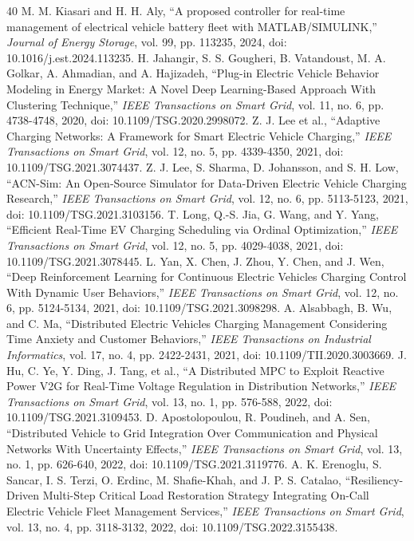 \documentclass[journal]{IEEEtran}
\begin{document}
\balance
\begin{thebibliography}{40}
 M. M. Kiasari and H. H. Aly, ``A proposed controller for real-time management of electrical vehicle battery fleet with MATLAB/SIMULINK,'' \emph{Journal of Energy Storage}, vol. 99, pp. 113235, 2024, doi: 10.1016/j.est.2024.113235.
 H. Jahangir, S. S. Gougheri, B. Vatandoust, M. A. Golkar, A. Ahmadian, and A. Hajizadeh, ``Plug-in Electric Vehicle Behavior Modeling in Energy Market: A Novel Deep Learning-Based Approach With Clustering Technique,'' \emph{IEEE Transactions on Smart Grid}, vol. 11, no. 6, pp. 4738-4748, 2020, doi: 10.1109/TSG.2020.2998072.
 Z. J. Lee et al., ``Adaptive Charging Networks: A Framework for Smart Electric Vehicle Charging,'' \emph{IEEE Transactions on Smart Grid}, vol. 12, no. 5, pp. 4339-4350, 2021, doi: 10.1109/TSG.2021.3074437.
 Z. J. Lee, S. Sharma, D. Johansson, and S. H. Low, ``ACN-Sim: An Open-Source Simulator for Data-Driven Electric Vehicle Charging Research,'' \emph{IEEE Transactions on Smart Grid}, vol. 12, no. 6, pp. 5113-5123, 2021, doi: 10.1109/TSG.2021.3103156.
 T. Long, Q.-S. Jia, G. Wang, and Y. Yang, ``Efficient Real-Time EV Charging Scheduling via Ordinal Optimization,'' \emph{IEEE Transactions on Smart Grid}, vol. 12, no. 5, pp. 4029-4038, 2021, doi: 10.1109/TSG.2021.3078445.
 L. Yan, X. Chen, J. Zhou, Y. Chen, and J. Wen, ``Deep Reinforcement Learning for Continuous Electric Vehicles Charging Control With Dynamic User Behaviors,'' \emph{IEEE Transactions on Smart Grid}, vol. 12, no. 6, pp. 5124-5134, 2021, doi: 10.1109/TSG.2021.3098298.
 A. Alsabbagh, B. Wu, and C. Ma, ``Distributed Electric Vehicles Charging Management Considering Time Anxiety and Customer Behaviors,'' \emph{IEEE Transactions on Industrial Informatics}, vol. 17, no. 4, pp. 2422-2431, 2021, doi: 10.1109/TII.2020.3003669.
 J. Hu, C. Ye, Y. Ding, J. Tang, et al., ``A Distributed MPC to Exploit Reactive Power V2G for Real-Time Voltage Regulation in Distribution Networks,'' \emph{IEEE Transactions on Smart Grid}, vol. 13, no. 1, pp. 576-588, 2022, doi: 10.1109/TSG.2021.3109453.
 D. Apostolopoulou, R. Poudineh, and A. Sen, ``Distributed Vehicle to Grid Integration Over Communication and Physical Networks With Uncertainty Effects,'' \emph{IEEE Transactions on Smart Grid}, vol. 13, no. 1, pp. 626-640, 2022, doi: 10.1109/TSG.2021.3119776.
 A. K. Erenoglu, S. Sancar, I. S. Terzi, O. Erdinc, M. Shafie-Khah, and J. P. S. Catalao, ``Resiliency-Driven Multi-Step Critical Load Restoration Strategy Integrating On-Call Electric Vehicle Fleet Management Services,'' \emph{IEEE Transactions on Smart Grid}, vol. 13, no. 4, pp. 3118-3132, 2022, doi: 10.1109/TSG.2022.3155438.

\end{thebibliography}
\end{document}
